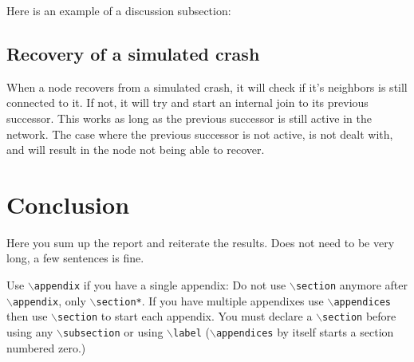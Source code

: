 \documentclass[conference]{IEEEtran}
\begin{document}
\bigskip

Here is an example of a discussion subsection:

\subsection{Recovery of a simulated crash}
\label{Subsection:Recovery_simulated_crash}
When a node recovers from a simulated crash, it will check if it's neighbors is still connected to it. If not, it will try and start an internal join to its previous successor. This works as long as the previous successor is still active in the network. The case where the previous successor is not active, is not dealt with, and will result in the node not being able to recover.


\section{Conclusion}
\label{Section:Conclusion}
Here you sum up the report and reiterate the results. Does not need to be very long, a few sentences is fine.


\printbibliography

{
	Use $\backslash${\tt{appendix}} if you have a single appendix:
	Do not use $\backslash${\tt{section}} anymore after $\backslash${\tt{appendix}}, only $\backslash${\tt{section*}}.
	If you have multiple appendixes use $\backslash${\tt{appendices}} then use $\backslash${\tt{section}} to start each appendix.
	You must declare a $\backslash${\tt{section}} before using any $\backslash${\tt{subsection}} or using $\backslash${\tt{label}} ($\backslash${\tt{appendices}} by itself
	starts a section numbered zero.)}



\end{document}

